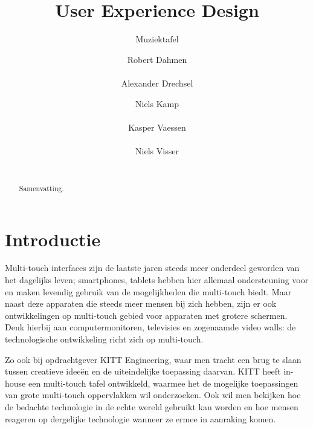 \documentclass{acm}
\begin{document}
\title{User Experience Design}
\subtitle{Muziektafel}

\author{
\alignauthor Robert Dahmen\\
       \\
\alignauthor Alexander Drechsel
       \\
\and
\alignauthor Niels Kamp\\
       \\
\alignauthor Kasper Vaessen\\
       \\
\alignauthor Niels Visser\\
       \\
}
\maketitle

\begin{abstract}
Samenvatting.
\end{abstract}


\section{Introductie}
Multi-touch interfaces zijn de laatste jaren steeds meer onderdeel geworden van het dagelijks leven; smartphones, tablets hebben hier allemaal ondersteuning voor en maken levendig gebruik van de mogelijkheden die multi-touch biedt. Maar naast deze apparaten die steeds meer mensen bij zich hebben, zijn er ook ontwikkelingen op multi-touch gebied voor apparaten met grotere schermen. Denk hierbij aan computermonitoren, televisies en zogenaamde video walls: de technologische ontwikkeling richt zich op multi-touch.

Zo ook bij opdrachtgever KITT Engineering, waar men tracht een brug te slaan tussen creatieve idee\"en en de uiteindelijke toepassing daarvan. KITT heeft in-house een multi-touch tafel ontwikkeld, waarmee het de mogelijke toepassingen van grote multi-touch oppervlakken wil onderzoeken. Ook wil men bekijken hoe de bedachte technologie in de echte wereld gebruikt kan worden en hoe mensen reageren op dergelijke technologie wanneer ze ermee in aanraking komen.
\end{document}
